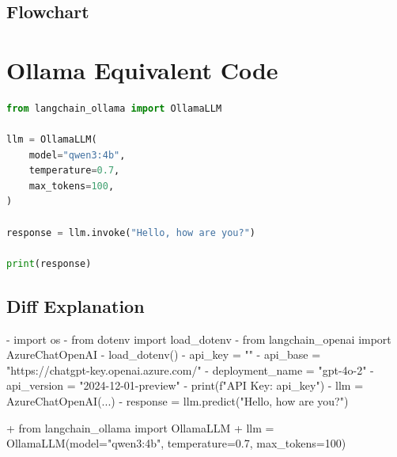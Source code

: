 \documentclass[11pt, a4paper]{article}
\begin{document}
\subsection{Flowchart}

\section{Ollama Equivalent Code}
\begin{lstlisting}[language=Python]
from langchain_ollama import OllamaLLM

llm = OllamaLLM(
    model="qwen3:4b",
    temperature=0.7,
    max_tokens=100,
)

response = llm.invoke("Hello, how are you?")

print(response)
\end{lstlisting}

\subsection{Diff Explanation}
\begin{removedcode}
\begin{diffverb}
- import os
- from dotenv import load_dotenv
- from langchain_openai import AzureChatOpenAI
- load_dotenv()
- api_key = ""
- api_base = "https://chatgpt-key.openai.azure.com/"
- deployment_name = "gpt-4o-2"
- api_version = "2024-12-01-preview"
- print(f"API Key: {api_key}")
- llm = AzureChatOpenAI(...)
- response = llm.predict("Hello, how are you?")
\end{diffverb}
\end{removedcode}

\begin{addedcode}
\begin{diffverb}
+ from langchain_ollama import OllamaLLM
+ llm = OllamaLLM(model="qwen3:4b", temperature=0.7, max_tokens=100)
\end{diffverb}
\end{addedcode}
\end{document}
